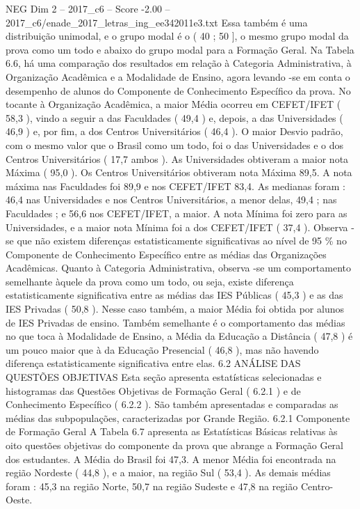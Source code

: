 \begin{textsample}{NEG Dim 2 – 2017\_c6 – Score -2.00 – 2017\_c6/enade\_2017\_letras\_ing\_ee342011e3.txt}
Essa também é uma distribuição unimodal, e o grupo modal é o ( 40 ; 50 ], o mesmo grupo modal da prova como um todo e abaixo do grupo modal para a Formação Geral.
Na Tabela 6.6, há uma comparação dos resultados em relação à Categoria Administrativa, à Organização Acadêmica e a Modalidade de Ensino, agora levando -se em conta o desempenho de alunos do Componente de Conhecimento Específico da prova.
No tocante à Organização Acadêmica, a maior Média ocorreu em CEFET/IFET ( 58,3 ), vindo a seguir a das Faculdades ( 49,4 ) e, depois, a das Universidades ( 46,9 ) e, por fim, a dos Centros Universitários ( 46,4 ).
O maior Desvio padrão, com o mesmo valor que o Brasil como um todo, foi o das Universidades e o dos Centros Universitários ( 17,7 ambos ).
As Universidades obtiveram a maior nota Máxima ( 95,0 ).
Os Centros Universitários obtiveram nota Máxima 89,5.
A nota máxima nas Faculdades foi 89,9 e nos CEFET/IFET 83,4.
As medianas foram : 46,4 nas Universidades e nos Centros Universitários, a menor delas, 49,4 ; nas Faculdades ; e 56,6 nos CEFET/IFET, a maior.
A nota Mínima foi zero para as Universidades, e a maior nota Mínima foi a dos CEFET/IFET ( 37,4 ).
Observa -se que não existem diferenças estatisticamente significativas ao nível de 95 \% no Componente de Conhecimento Específico entre as médias das Organizações Acadêmicas.
Quanto à Categoria Administrativa, observa -se um comportamento semelhante àquele da prova como um todo, ou seja, existe diferença estatisticamente significativa entre as médias das IES Públicas ( 45,3 ) e as das IES Privadas ( 50,8 ).
Nesse caso também, a maior Média foi obtida por alunos de IES Privadas de ensino.
Também semelhante é o comportamento das médias no que toca à Modalidade de Ensino, a Média da Educação a Distância ( 47,8 ) é um pouco maior que à da Educação Presencial ( 46,8 ), mas não havendo diferença estatisticamente significativa entre elas. 6.2 ANÁLISE DAS QUESTÕES OBJETIVAS Esta seção apresenta estatísticas selecionadas e histogramas das Questões Objetivas de Formação Geral ( 6.2.1 ) e de Conhecimento Específico ( 6.2.2 ).
São também apresentadas e comparadas as médias das subpopulações, caracterizadas por Grande Região. 6.2.1 Componente de Formação Geral A Tabela 6.7 apresenta as Estatísticas Básicas relativas às oito questões objetivas do componente da prova que abrange a Formação Geral dos estudantes.
A Média do Brasil foi 47,3.
A menor Média foi encontrada na região Nordeste ( 44,8 ), e a maior, na região Sul ( 53,4 ).
As demais médias foram : 45,3 na região Norte, 50,7 na região Sudeste e 47,8 na região Centro-Oeste.

\end{textsample}
